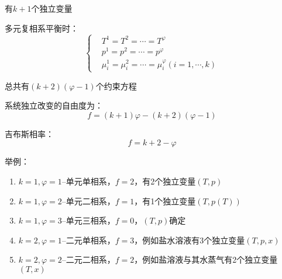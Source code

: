 \documentclass[oneside]{ctexbook}
\begin{document}
有\(k+1\)个独立变量

多元复相系平衡时：
\begin{equation}
\left\{\begin{aligned}
    &T^1=T^2=\cdots=T^\varphi\\
    &p^1=p^2=\cdots=p^\varphi\\
    &\mu_i^1=\mu_i^2=\cdots=\mu_i^\varphi(i=1,\cdots,k)
\end{aligned}\right.
\end{equation}

总共有\((k+2)(\varphi-1)\)个约束方程

系统独立改变的自由度为：
\begin{equation}
f=(k+1)\varphi-(k+2)(\varphi-1)
\end{equation}

吉布斯相率：
\begin{equation}
f=k+2-\varphi
\end{equation}

举例：
\begin{enumerate}
    \item \(k=1,\varphi=1\)--单元单相系，\(f=2\)，有2个独立变量\((T,p)\)
    \item \(k=1,\varphi=2\)--单元二相系，\(f=1\)，有1个独立变量\((T,p(T))\)
    \item \(k=1,\varphi=3\)--单元三相系，\(f=0\)，\((T,p)\)确定
    \item \(k=2,\varphi=1\)--二元单相系，\(f=3\)，例如盐水溶液有3个独立变量\((T,p,x)\)
    \item \(k=2,\varphi=2\)--二元二相系，\(f=2\)，例如盐溶液与其水蒸气有2个独立变量\((T,x)\)
\end{enumerate}
\end{document}
